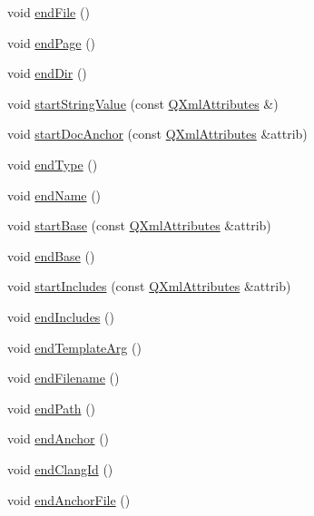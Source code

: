 \begin{DoxyCompactItemize}
\item 
void \hyperlink{class_tag_file_parser_aefa0fddc21d84d09769eb62690a6bf93}{end\+File} ()
\item 
void \hyperlink{class_tag_file_parser_ae85e845d46b1032f51d6efd833bc5061}{end\+Page} ()
\item 
void \hyperlink{class_tag_file_parser_af425bde6cf85ebc042b01decc1370eda}{end\+Dir} ()
\item 
void \hyperlink{class_tag_file_parser_a6a6319a60a875f3771ba420465691dab}{start\+String\+Value} (const \hyperlink{class_q_xml_attributes}{Q\+Xml\+Attributes} \&)
\item 
void \hyperlink{class_tag_file_parser_adbba8c8baa5115e73376f94529395010}{start\+Doc\+Anchor} (const \hyperlink{class_q_xml_attributes}{Q\+Xml\+Attributes} \&attrib)
\item 
void \hyperlink{class_tag_file_parser_aa93bd22b0121cafa26c559948c98acce}{end\+Type} ()
\item 
void \hyperlink{class_tag_file_parser_ac070eedd9f9f365fccc7519e30ca66c2}{end\+Name} ()
\item 
void \hyperlink{class_tag_file_parser_ac9fab44512abd410a1e351cc41e9abd7}{start\+Base} (const \hyperlink{class_q_xml_attributes}{Q\+Xml\+Attributes} \&attrib)
\item 
void \hyperlink{class_tag_file_parser_a77b9865b6dbdc647b825c2ac5440648a}{end\+Base} ()
\item 
void \hyperlink{class_tag_file_parser_a0703a045114c51e2c8a265a4f7b59d50}{start\+Includes} (const \hyperlink{class_q_xml_attributes}{Q\+Xml\+Attributes} \&attrib)
\item 
void \hyperlink{class_tag_file_parser_a4a6f3a01d14a9233322d1281ac568e2b}{end\+Includes} ()
\item 
void \hyperlink{class_tag_file_parser_a69ef902b3409f6cb1c09dd23ea836838}{end\+Template\+Arg} ()
\item 
void \hyperlink{class_tag_file_parser_aeb11d87bb2fd76859a6d1390ec5565c8}{end\+Filename} ()
\item 
void \hyperlink{class_tag_file_parser_ac9a90fee9e64016f476fd4f71ae5fc3c}{end\+Path} ()
\item 
void \hyperlink{class_tag_file_parser_a7f1486b9a2a926ecc5dce03420148f91}{end\+Anchor} ()
\item 
void \hyperlink{class_tag_file_parser_a6a2bcfbad3ba6c6eda830ddec5e2e9f8}{end\+Clang\+Id} ()
\item 
void \hyperlink{class_tag_file_parser_a4fd27631371b12c34da983007311f032}{end\+Anchor\+File} ()

\end{DoxyCompactItemize}
